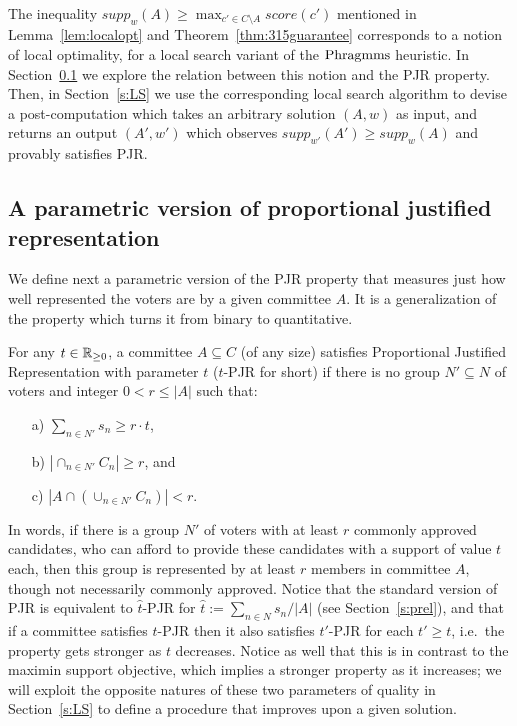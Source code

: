 The inequality $supp_w(A)\geq \max_{c'\in C\setminus A} score(c')$ mentioned in Lemma~\ref{lem:localopt} and Theorem~\ref{thm:315guarantee} corresponds to a notion of local optimality, for a local search variant of the $\operatorname{Phragmms}$ heuristic. 
In Section~\ref{s:tPJR} we explore the relation between this notion and the PJR property. 
Then, in Section~\ref{s:LS} we use the corresponding local search algorithm to devise a post-computation which takes an arbitrary solution $(A,w)$ as input, and returns an output $(A',w')$ which observes $supp_{w'}(A')\geq supp_w(A)$ and provably satisfies PJR.

\subsection{A parametric version of proportional justified representation}\label{s:tPJR}

We define next a parametric version of the PJR property that measures just how well represented the voters are by a given committee $A$. It is a generalization of the property which turns it from binary to quantitative.

\begin{definition}
For any $t\in\mathbb{R}_{\geq 0}$, a committee $A\subseteq C$ (of any size) satisfies Proportional Justified Representation with parameter $t$ ($t$-PJR for short) if there is no group $N'\subseteq N$ of voters and integer $0<r\leq |A|$ such that:
\begin{itemize}
\item[a)] $\sum_{n\in N'} s_n \geq r\cdot t$,
\item[b)] $|\cap_{n\in N'} C_n|\geq r$, and
\item[c)] $|A\cap (\cup_{n\in N'} C_n)|<r$.
\end{itemize}
\end{definition}

In words, if there is a group $N'$ of voters with at least $r$ commonly approved candidates, who can afford to provide these candidates with a support of value $t$ each, then this group is represented by at least $r$ members in committee $A$, though not necessarily commonly approved. Notice that the standard version of PJR is equivalent to $\hat{t}$-PJR for $\hat{t}:=\sum_{n\in N} s_n / |A|$ (see Section~\ref{s:prel}), and that if a committee satisfies $t$-PJR then it also satisfies $t'$-PJR for each $t'\geq t$, i.e.~the property gets stronger as $t$ decreases. 
Notice as well that this is in contrast to the maximin support objective, which implies a stronger property as it increases; we will exploit the opposite natures of these two parameters of quality in Section~\ref{s:LS} to define a procedure that improves upon a given solution.

